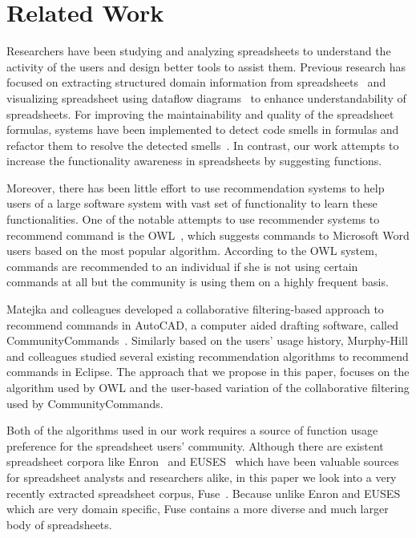\documentclass[conference]{IEEEtran}
\begin{document}
\section{Related Work}
Researchers have been studying and analyzing spreadsheets to understand the activity of the users and design better tools to assist them. Previous research has focused on extracting structured domain information from spreadsheets~\cite{hermans2010automatically} and visualizing spreadsheet using dataflow diagrams~\cite{hermans2011breviz} to enhance understandability of spreadsheets. For improving the maintainability and quality of the spreadsheet formulas, systems have been implemented to detect code smells in formulas and refactor them to resolve the detected smells~\cite{hermans2014detecting}. In contrast, our work attempts to increase the functionality awareness in spreadsheets by suggesting functions.

Moreover, there has been little effort to use recommendation systems to help users of a large   software system with vast set of functionality to learn these functionalities. One of the notable attempts to use recommender systems to recommend command is the OWL~\cite{linton2000owl}, which suggests commands to Microsoft Word users based on the most popular algorithm. According to the OWL system, commands are recommended to an individual if she is not using certain commands at all but the community is using them on a highly frequent basis.

Matejka and colleagues developed a collaborative filtering-based approach to recommend commands in AutoCAD, a computer aided drafting software, called CommunityCommands~\cite{matejka2009communitycommands}. Similarly based on the users' usage history, Murphy-Hill and colleagues studied several existing recommendation algorithms to recommend commands in Eclipse. The approach that we propose in this paper,  focuses on the algorithm used by OWL and the user-based variation of the collaborative filtering used by CommunityCommands.

Both of the algorithms used in our work requires a source of function usage preference for the spreadsheet users' community. Although there are existent spreadsheet corpora like Enron~\cite{hermans2014enron} and EUSES~\cite{fisher2005euses} which have been valuable sources for spreadsheet analysts and researchers alike, in this paper we look into a very recently extracted spreadsheet corpus, Fuse~\cite{barik2015fuse}. Because unlike Enron and EUSES which are very domain specific, Fuse contains a more diverse and much larger body of spreadsheets.
\end{document}
